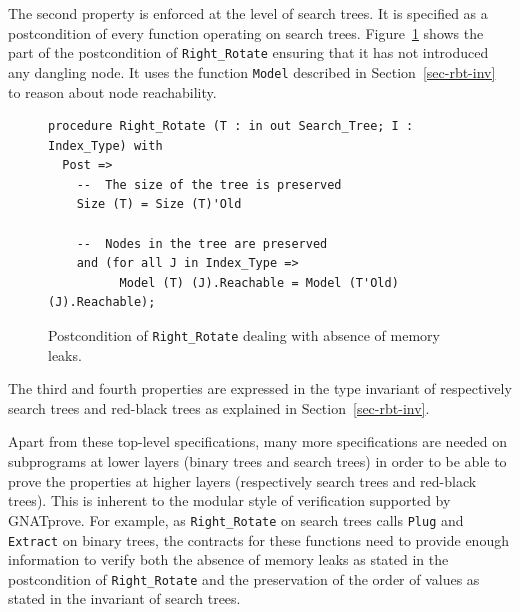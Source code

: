 \documentclass{llncs}
\newcommand{\gnatprove}{GNATprove\xspace}
\begin{document}
The second property is enforced at the level of search trees. It is specified
as a postcondition of every function operating on search trees.
Figure~\ref{fig-spec-no-leak} shows the part of the postcondition of
\texttt{Right\_Rotate} ensuring that it has not introduced any dangling
node. It uses the function \texttt{Model} described in
Section~\ref{sec-rbt-inv} to reason about node reachability.

\begin{figure}[ht]
\vspace{-0.5cm}
\begin{small}
\begin{lstlisting}
procedure Right_Rotate (T : in out Search_Tree; I : Index_Type) with
  Post =>
    --  The size of the tree is preserved
    Size (T) = Size (T)'Old

    --  Nodes in the tree are preserved
    and (for all J in Index_Type =>
          Model (T) (J).Reachable = Model (T'Old) (J).Reachable);
\end{lstlisting}
\end{small}
\caption{\label{fig-spec-no-leak} Postcondition of \texttt{Right\_Rotate} dealing with absence of memory leaks.}
\vspace{-0.5cm}
\end{figure}

The third and fourth properties are expressed in the type invariant of
respectively search trees and red-black trees as explained in
Section~\ref{sec-rbt-inv}.

Apart from these top-level specifications, many more specifications are needed
on subprograms at lower layers (binary trees and search trees) in order to be
able to prove the properties at higher layers (respectively search trees and
red-black trees). This is inherent to the modular style of verification
supported by \gnatprove. For example, as \texttt{Right\_Rotate} on search trees
calls \texttt{Plug} and \texttt{Extract} on binary trees, the contracts for
these functions need to provide enough information to verify both the absence
of memory leaks as stated in the postcondition of \texttt{Right\_Rotate} and
the preservation of the order of values as stated in the invariant of search
trees.


\end{document}
